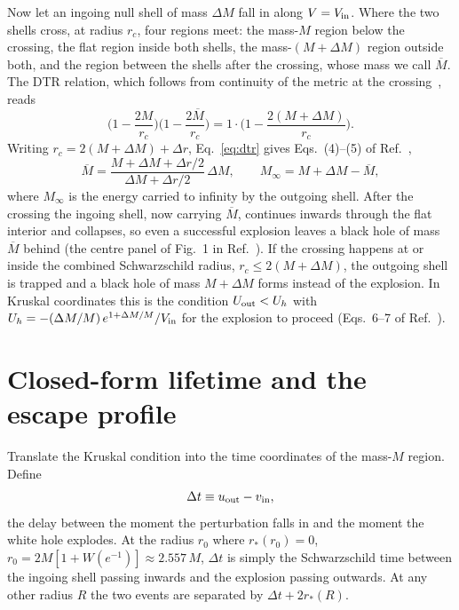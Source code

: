 \documentclass[11pt,a4paper]{article}
\newcommand{\dM}{\Delta M}
\begin{document}
Now let an ingoing null shell of mass $\dM$ fall in along $V=V_{\rm in}$. Where the two shells cross, at radius $r_c$, four regions meet: the mass-$M$ region below the crossing, the flat region inside both shells, the mass-$(M+\dM)$ region outside both, and the region between the shells after the crossing, whose mass we call $\overline{M}$. The DTR relation, which follows from continuity of the metric at the crossing~\cite{DrayTHooft1985,Redmount1985}, reads
\begin{equation}
\Big(1-\frac{2M}{r_c}\Big)\Big(1-\frac{2\overline M}{r_c}\Big) = 1\cdot\Big(1-\frac{2(M+\dM)}{r_c}\Big).
\label{eq:dtr}
\end{equation}
Writing $r_c = 2(M+\dM)+\Delta r$, Eq.~\eqref{eq:dtr} gives Eqs.~(4)--(5) of Ref.~\cite{BCG2016},
\begin{equation}
\overline{M} = \frac{M+\dM+\Delta r/2}{\dM+\Delta r/2}\,\dM, \qquad M_\infty = M+\dM-\overline{M},
\label{eq:Mbar}
\end{equation}
where $M_\infty$ is the energy carried to infinity by the outgoing shell. After the crossing the ingoing shell, now carrying $\overline M$, continues inwards through the flat interior and collapses, so even a successful explosion leaves a black hole of mass $\overline M$ behind (the centre panel of Fig.~1 in Ref.~\cite{BCG2016}). If the crossing happens at or inside the combined Schwarzschild radius, $r_c \le 2(M+\dM)$, the outgoing shell is trapped and a black hole of mass $M+\dM$ forms instead of the explosion. In Kruskal coordinates this is the condition $U_{\rm out} < U_h$ with $U_h = -(\dM/M)\,e^{1+\dM/M}/V_{\rm in}$ for the explosion to proceed (Eqs.~6--7 of Ref.~\cite{BCG2016}).

\section{Closed-form lifetime and the escape profile}\label{sec:lifetime}

Translate the Kruskal condition into the time coordinates of the mass-$M$ region. Define
\begin{equation}
\Delta t \equiv u_{\rm out} - v_{\rm in},
\end{equation}
the delay between the moment the perturbation falls in and the moment the white hole explodes. At the radius $r_0$ where $r_*(r_0)=0$, $r_0 = 2M[1+W(e^{-1})] \approx 2.557\,M$, $\Delta t$ is simply the Schwarzschild time between the ingoing shell passing inwards and the explosion passing outwards. At any other radius $R$ the two events are separated by $\Delta t + 2r_*(R)$.
\end{document}
